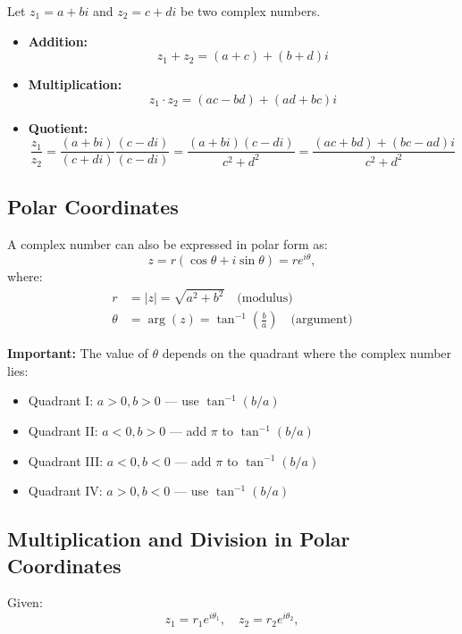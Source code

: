 Let \( z_1 = a + bi \) and \( z_2 = c + di \) be two complex numbers.

\begin{itemize}[label=\(-\)]
	\item \textbf{Addition:}
	      \[
		      z_1 + z_2 = (a + c) + (b + d)i
	      \]

	\item \textbf{Multiplication:}
	      \[
		      z_1 \cdot z_2 = (ac - bd) + (ad + bc)i
	      \]

	\item \textbf{Quotient:}
	      \[
		      \frac{z_1}{z_2} = \frac{(a + bi)}{(c + di)} \frac{(c - di)}{(c - di)} = \frac{(a + bi)(c - di)}{c^2 + d^2} = \frac{(ac + bd) + (bc - ad)i}{c^2 + d^2}
	      \]
\end{itemize}

\subsection{Polar Coordinates}

A complex number can also be expressed in polar form as:
\[
	z = r(\cos \theta + i \sin \theta) = re^{i\theta},
\]
where:
\begin{align*}
	r      & = |z| = \sqrt{a^2 + b^2} \quad \text{(modulus)}                       \\
	\theta & = \arg(z) = \tan^{-1}\left(\frac{b}{a}\right) \quad \text{(argument)}
\end{align*}

\textbf{Important:} The value of \( \theta \) depends on the quadrant where the complex number lies:
\begin{itemize}[label=\(-\)]
	\item Quadrant I: \( a > 0, b > 0 \) — use \( \tan^{-1}(b/a) \)
	\item Quadrant II: \( a < 0, b > 0 \) — add \( \pi \) to \( \tan^{-1}(b/a) \)
	\item Quadrant III: \( a < 0, b < 0 \) — add \( \pi \) to \( \tan^{-1}(b/a) \)
	\item Quadrant IV: \( a > 0, b < 0 \) — use \( \tan^{-1}(b/a) \)
\end{itemize}

\subsection{Multiplication and Division in Polar Coordinates}

Given:
\[
	z_1 = r_1 e^{i\theta_1}, \quad z_2 = r_2 e^{i\theta_2},
\]

